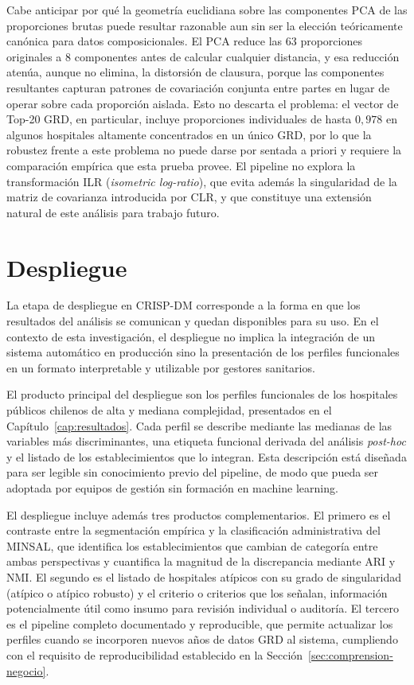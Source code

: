 Cabe anticipar por qué la geometría euclidiana sobre las componentes PCA de las
proporciones brutas puede resultar razonable aun sin ser la elección teóricamente
canónica para datos composicionales. El PCA reduce las 63 proporciones originales
a 8 componentes antes de calcular cualquier distancia, y esa reducción atenúa,
aunque no elimina, la distorsión de clausura, porque las componentes resultantes
capturan patrones de covariación conjunta entre partes en lugar de operar sobre
cada proporción aislada. Esto no descarta el problema: el vector de Top-20 GRD,
en particular, incluye proporciones individuales de hasta $0{,}978$ en algunos
hospitales altamente concentrados en un único GRD, por lo que la robustez
frente a este problema no puede darse por sentada a priori y requiere la
comparación empírica que esta prueba provee. El pipeline no explora la
transformación ILR (\textit{isometric log-ratio}), que evita además la
singularidad de la matriz de covarianza introducida por CLR, y que constituye una
extensión natural de este análisis para trabajo futuro.

\section{Despliegue}
\label{sec:despliegue}

La etapa de despliegue en CRISP-DM corresponde a la forma en que los resultados
del análisis se comunican y quedan disponibles para su uso. En el contexto de
esta investigación, el despliegue no implica la integración de un sistema
automático en producción sino la presentación de los perfiles funcionales en un
formato interpretable y utilizable por gestores sanitarios.

El producto principal del despliegue son los perfiles funcionales de los
hospitales públicos chilenos de alta y mediana complejidad, presentados en el
Capítulo~\ref{cap:resultados}. Cada perfil se describe mediante las medianas de
las variables más discriminantes, una etiqueta funcional derivada del análisis
\textit{post-hoc} y el listado de los establecimientos que lo integran. Esta
descripción está diseñada para ser legible sin conocimiento previo del pipeline,
de modo que pueda ser adoptada por equipos de gestión sin formación en
machine learning.

El despliegue incluye además tres productos complementarios. El primero es el
contraste entre la segmentación empírica y la clasificación administrativa del
MINSAL, que identifica los establecimientos que cambian de categoría entre ambas
perspectivas y cuantifica la magnitud de la discrepancia mediante ARI y NMI. El
segundo es el listado de hospitales atípicos con su grado de singularidad
(atípico o atípico robusto) y el criterio o criterios que los señalan, información
potencialmente útil como insumo para revisión individual o auditoría. El
tercero es el pipeline completo documentado y reproducible, que permite actualizar
los perfiles cuando se incorporen nuevos años de datos GRD al sistema, cumpliendo
con el requisito de reproducibilidad establecido en la
Sección~\ref{sec:comprension-negocio}.
